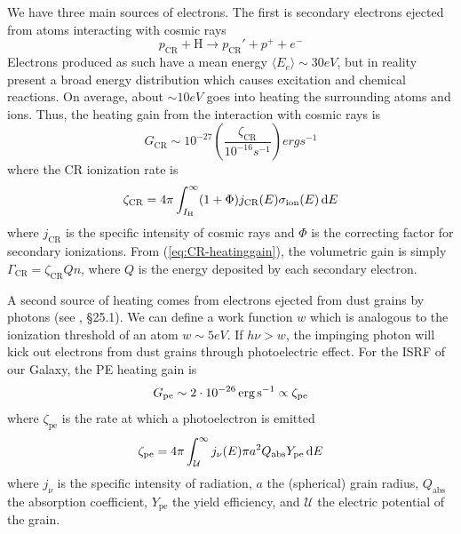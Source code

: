 We have three main sources of electrons. The first is secondary electrons ejected from atoms interacting with cosmic rays \cite{2012ApJ...756..157G}
\begin{equation*}
    p_{\text{CR}} + \text{H} \to p_{\text{CR}}' + p^{+}+e^{-}
\end{equation*}
Electrons produced as such have a mean energy $\langle E_{e}\rangle \sim 30\unit{eV}$, but in reality present a broad energy distribution which causes excitation and chemical reactions. On average, about $\sim 10\unit{eV}$ goes into heating the surrounding atoms and ions. Thus, the heating gain from the interaction with cosmic rays is 
\begin{equation}
    G_{\text{CR}} \sim 10^{-27}\left(\frac{\zeta_{\text{CR}}}{10^{-16}\unit{s}^{-1}}\right)\unit{erg}\unit{s}^{-1}
    \label{eq:CR-heatinggain}
\end{equation}
where the CR ionization rate is 
\begin{equation}
    \zeta_{\text{CR}} = 4\pi \int_{I_{\text{H}}}^{\infty} (1+\Phi)j_{\text{CR}}(E)\sigma_{\text{ion}}(E)\,\text{d}E
    \label{eq:CR-ionizationrate}
\end{equation}
where $j_{\text{CR}}$ is the specific intensity of cosmic rays and $\Phi$ is the correcting factor for secondary ionizations. From (\ref{eq:CR-heatinggain}), the volumetric gain is simply $\Gamma_{\text{CR}} = \zeta_{\text{CR}}Qn$, where $Q$ is the energy deposited by each secondary electron.
\par A second source of heating comes from electrons ejected from dust grains by photons (see \cite{2011piim.book.....D}, §25.1). We can define a work function $w$ which is analogous to the ionization threshold of an atom $w \sim 5\unit{eV}$. If $h\nu > w$, the impinging photon will kick out electrons from dust grains through photoelectric effect. For the ISRF of our Galaxy, the PE heating gain is 
\begin{equation}
    G_{\text{pe}} \sim 2\cdot 10^{-26}\,\text{erg}\,\text{s}^{-1}\propto \zeta_{\text{pe}}
    \label{eq:PE-heatinggain}
\end{equation}
where $\zeta_{\text{pe}}$ is the rate at which a photoelectron is emitted 
\begin{equation}
    \zeta_{\text{pe}} = 4\pi \int_{\mathcal{U}}^{\infty} j_{\nu}(E)\pi a^{2}Q_{\text{abs}}Y_{\text{pe}}\,\text{d}E
    \label{eq:GR-photoelectronrate}
\end{equation}
where $j_{\nu}$ is the specific intensity of radiation, $a$ the (spherical) grain radius, $Q_{\text{abs}}$ the absorption coefficient, $Y_{\text{pe}}$ the yield efficiency, and $\mathcal{U}$ the electric potential of the grain.
